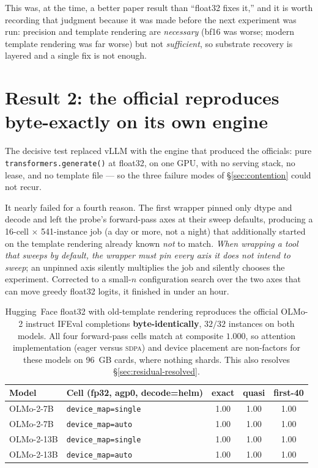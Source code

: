 \documentclass[11pt]{report}
\newcommand{\code}[1]{\texttt{#1}}
\begin{document}
This was, at the time, a better paper result than ``float32 fixes it,'' and it is
worth recording that judgment because it was made before the next experiment was
run: precision and template rendering are \emph{necessary} (bf16 was worse; modern
template rendering was far worse) but not \emph{sufficient}, so substrate recovery
is layered and a single fix is not enough.

\section{Result 2: the official reproduces byte-exactly on its own engine}

The decisive test replaced vLLM with the engine that produced the officials: pure
\code{transformers.generate()} at float32, on one GPU, with no serving stack, no
lease, and no template file --- so the three failure modes of \S\ref{sec:contention}
could not recur.

It nearly failed for a fourth reason. The first wrapper pinned only dtype and decode
and left the probe's forward-pass axes at their sweep defaults, producing a 16-cell
$\times$ 541-instance job (a day or more, not a night) that additionally started on
the template rendering already known \emph{not} to match. \emph{When wrapping a tool
that sweeps by default, the wrapper must pin every axis it does not intend to
sweep}; an unpinned axis silently multiplies the job and silently chooses the
experiment. Corrected to a small-$n$ configuration search over the two axes that can
move greedy float32 logits, it finished in under an hour.

\begin{table}[H]
\centering
\small
\begin{tabular}{llccc}
\toprule
\textbf{Model} & \textbf{Cell (fp32, agp0, decode=helm)} & \textbf{exact} &
\textbf{quasi} & \textbf{first-40} \\
\midrule
OLMo-2-7B  & \code{device\_map=single} & 1.00 & 1.00 & 1.00 \\
OLMo-2-7B  & \code{device\_map=auto}   & 1.00 & 1.00 & 1.00 \\
OLMo-2-13B & \code{device\_map=single} & 1.00 & 1.00 & 1.00 \\
OLMo-2-13B & \code{device\_map=auto}   & 1.00 & 1.00 & 1.00 \\
\bottomrule
\end{tabular}
\caption{Hugging~Face float32 with old-template rendering reproduces the official
OLMo-2 instruct IFEval completions \textbf{byte-identically}, $32/32$ instances on
both models. All four forward-pass cells match at composite $1.000$, so attention
implementation (eager versus \textsc{sdpa}) and device placement are non-factors for
these models on 96~GB cards, where nothing shards. This also resolves
\S\ref{sec:residual-resolved}.}
\label{tab:hffp32}
\end{table}
\end{document}
